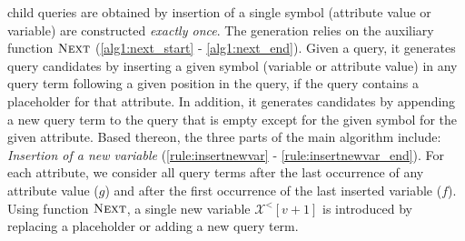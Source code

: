 child queries are obtained by
insertion
of a single symbol (attribute value or variable) are constructed
\emph{exactly once}. The generation relies on the auxiliary function
$\textsc{Next}$
(\autoref{alg1:next_start} - \ref{alg1:next_end}). Given a query, it
generates query candidates by inserting a given symbol (variable or attribute value) in
any query term following a given position in the query, if the query
contains a placeholder for that attribute. In addition, it
generates candidates by appending a new query term to the query that
is empty except for the given symbol for the given attribute. Based thereon,
the three parts of the main algorithm include:
\textit{Insertion of a new variable} (\autoref{rule:insertnewvar} -
\ref{rule:insertnewvar_end}). For each attribute, we consider all query
terms after the last occurrence of any attribute value ($g$) and after the first
occurrence of the last inserted variable ($f$). Using function
$\textsc{Next}$, a single new variable $\mathcal{X}^<[v+1]$ is introduced
by replacing a placeholder or adding a new query term.
